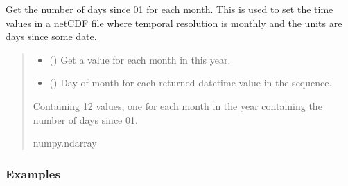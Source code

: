 \documentclass[letterpaper,10pt,english]{sphinxmanual}
\begin{document}
\begin{fulllineitems}
\label{\detokenize{misc:glomar_gridding.utils.days_since_by_month}}
\pysigstartsignatures
\pysiglinewithargsret
{}
{\sphinxparamcomma {}}
{}
\pysigstopsignatures
\sphinxAtStartPar
Get the number of days since \sphinxhyphen{}01\sphinxhyphen{} for each month. This is used
to set the time values in a netCDF file where temporal resolution is monthly
and the units are days since some date.
\begin{quote}\begin{description}
\begin{itemize}
\item {}
\sphinxAtStartPar
{} () \textendash{} Get a value for each month in this year.

\item {}
\sphinxAtStartPar
{} () \textendash{} Day of month for each returned datetime value in the sequence.

\end{itemize}

\sphinxAtStartPar
Containing 12 values, one for each month in the year containing the
number of days since \sphinxhyphen{}01\sphinxhyphen{}.

\sphinxAtStartPar
numpy.ndarray

\end{description}\end{quote}
\subsubsection*{Examples}

\begin{sphinxVerbatim}[commandchars=\\\{\}]
 
\end{sphinxVerbatim}

\end{fulllineitems}
\end{document}
